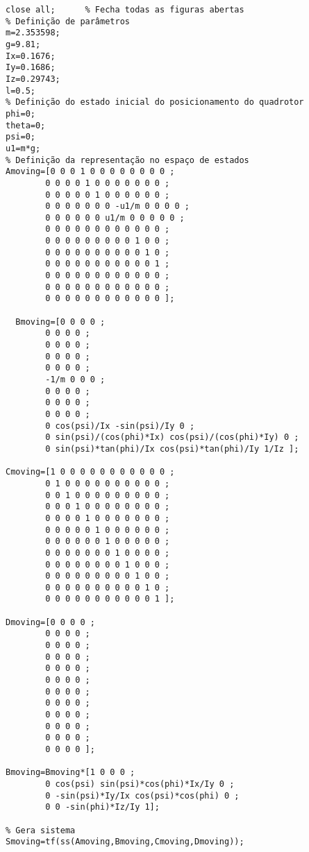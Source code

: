 \begin{lstlisting}[inputencoding=latin1]
close all;		% Fecha todas as figuras abertas
% Definição de parâmetros
m=2.353598;
g=9.81;
Ix=0.1676;
Iy=0.1686;
Iz=0.29743;
l=0.5;
% Definição do estado inicial do posicionamento do quadrotor
phi=0;
theta=0;
psi=0;
u1=m*g;
% Definição da representação no espaço de estados
Amoving=[0 0 0 1 0 0 0 0 0 0 0 0 ; 
    	0 0 0 0 1 0 0 0 0 0 0 0 ; 
    	0 0 0 0 0 1 0 0 0 0 0 0 ;
		0 0 0 0 0 0 0 -u1/m 0 0 0 0 ; 
		0 0 0 0 0 0 u1/m 0 0 0 0 0 ; 
		0 0 0 0 0 0 0 0 0 0 0 0 ;
		0 0 0 0 0 0 0 0 0 1 0 0 ; 
		0 0 0 0 0 0 0 0 0 0 1 0 ;
		0 0 0 0 0 0 0 0 0 0 0 1 ;
		0 0 0 0 0 0 0 0 0 0 0 0 ; 
		0 0 0 0 0 0 0 0 0 0 0 0 ;
		0 0 0 0 0 0 0 0 0 0 0 0 ];
    
  Bmoving=[0 0 0 0 ; 
		0 0 0 0 ; 
		0 0 0 0 ; 
		0 0 0 0 ; 
		0 0 0 0 ; 
		-1/m 0 0 0 ; 
		0 0 0 0 ; 
		0 0 0 0 ; 
		0 0 0 0 ; 
		0 cos(psi)/Ix -sin(psi)/Iy 0 ; 
		0 sin(psi)/(cos(phi)*Ix) cos(psi)/(cos(phi)*Iy) 0 ; 
		0 sin(psi)*tan(phi)/Ix cos(psi)*tan(phi)/Iy 1/Iz ];
   
Cmoving=[1 0 0 0 0 0 0 0 0 0 0 0 ; 
		0 1 0 0 0 0 0 0 0 0 0 0 ; 
		0 0 1 0 0 0 0 0 0 0 0 0 ; 
		0 0 0 1 0 0 0 0 0 0 0 0 ; 
		0 0 0 0 1 0 0 0 0 0 0 0 ; 
		0 0 0 0 0 1 0 0 0 0 0 0 ; 
		0 0 0 0 0 0 1 0 0 0 0 0 ; 
		0 0 0 0 0 0 0 1 0 0 0 0 ; 
		0 0 0 0 0 0 0 0 1 0 0 0 ; 
		0 0 0 0 0 0 0 0 0 1 0 0 ; 
		0 0 0 0 0 0 0 0 0 0 1 0 ; 
		0 0 0 0 0 0 0 0 0 0 0 1 ];

Dmoving=[0 0 0 0 ; 
		0 0 0 0 ; 
		0 0 0 0 ; 
		0 0 0 0 ; 
		0 0 0 0 ; 
		0 0 0 0 ;
		0 0 0 0 ; 
		0 0 0 0 ; 
		0 0 0 0 ; 
		0 0 0 0 ; 
		0 0 0 0 ; 
		0 0 0 0 ];
    
Bmoving=Bmoving*[1 0 0 0 ; 
		0 cos(psi) sin(psi)*cos(phi)*Ix/Iy 0 ; 
		0 -sin(psi)*Iy/Ix cos(psi)*cos(phi) 0 ; 
		0 0 -sin(phi)*Iz/Iy 1];

% Gera sistema 
Smoving=tf(ss(Amoving,Bmoving,Cmoving,Dmoving));

\end{lstlisting}